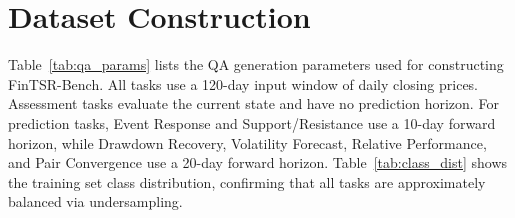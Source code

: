 \section{Dataset Construction}
\label{app:dataset}

Table~\ref{tab:qa_params} lists the QA generation parameters used for constructing FinTSR-Bench.
All tasks use a 120-day input window of daily closing prices.
Assessment tasks evaluate the current state and have no prediction horizon.
For prediction tasks, Event Response and Support/Resistance use a 10-day forward horizon, while Drawdown Recovery, Volatility Forecast, Relative Performance, and Pair Convergence use a 20-day forward horizon.
Table~\ref{tab:class_dist} shows the training set class distribution, confirming that all tasks are approximately balanced via undersampling.


\begin{table}[h]
\centering
\caption{QA generation parameters.}
\label{tab:qa_params}
\vspace{5pt}
\end{table}

